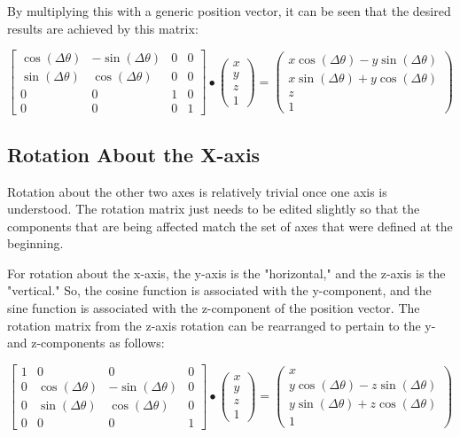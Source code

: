 \documentclass{article}
\begin{document}
	By multiplying this with a generic position vector, it can be seen that the desired results are achieved by this matrix: \par
	\[
		\begin{bmatrix}
			\cos(\Delta\theta) & -\sin(\Delta\theta) & 0 & 0 \\
			\sin(\Delta\theta) &  \cos(\Delta\theta) & 0 & 0 \\
			0 & 0 & 1 & 0 \\
			0 & 0 & 0 & 1
		\end{bmatrix}
		\bullet
		\begin{pmatrix}
			x \\
			y \\
			z \\
			1
		\end{pmatrix}
		=
		\begin{pmatrix}
			x\cos(\Delta\theta) - y\sin(\Delta\theta) \\
			x\sin(\Delta\theta) + y\cos(\Delta\theta) \\
			z \\
			1
		\end{pmatrix}
	\]

	\subsection{Rotation About the X-axis}

	Rotation about the other two axes is relatively trivial once one axis is understood. The rotation matrix just needs to be edited slightly so that the components that are being affected match the set of axes that were defined at the beginning. \par
	For rotation about the x-axis, the y-axis is the "horizontal," and the z-axis is the "vertical." So, the cosine function is associated with the y-component, and the sine function is associated with the z-component of the position vector. The rotation matrix from the z-axis rotation can be rearranged to pertain to the y- and z-components as follows: \par
	\[
		\begin{bmatrix}
			1 & 0 & 0 & 0 \\
			0 & \cos(\Delta\theta) & -\sin(\Delta\theta) & 0 \\
			0 & \sin(\Delta\theta) &  \cos(\Delta\theta) & 0 \\
			0 & 0 & 0 & 1
		\end{bmatrix}
		\bullet
		\begin{pmatrix}
			x \\
			y \\
			z \\
			1
		\end{pmatrix}
		=
		\begin{pmatrix}
			x \\
			y\cos(\Delta\theta) - z\sin(\Delta\theta) \\
			y\sin(\Delta\theta) + z\cos(\Delta\theta) \\
			1
		\end{pmatrix}
	\]
\end{document}
